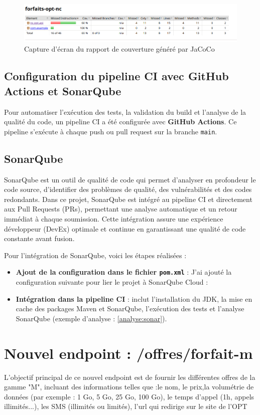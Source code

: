 \documentclass[11pt]{article}
\begin{document}
		\begin{figure}[h!]
			\centering
			\includegraphics[width=\textwidth]{asset/jacoco.png}
			\caption{Capture d'écran du rapport de couverture généré par JaCoCo}
			\label{fig:jacoco-report}
		\end{figure}
		
		\subsection{Configuration du pipeline CI avec GitHub Actions et SonarQube}
		Pour automatiser l'exécution des tests, la validation du build et l'analyse de la qualité du code, un pipeline CI a été configurée avec \textbf{GitHub Actions}. Ce pipeline s'exécute à chaque push ou pull request sur la branche \texttt{main}.
		
		\subsection{SonarQube}
		SonarQube est un outil de qualité de code qui permet d'analyser en profondeur le code source, d'identifier des problèmes de qualité, des vulnérabilités et des codes redondants. Dans ce projet, SonarQube est intégré au pipeline CI et directement aux Pull Requests (PRs), permettant une analyse automatique et un retour immédiat à chaque soumission. Cette intégration assure une expérience développeur (DevEx) optimale et continue en garantissant une qualité de code constante avant fusion.
		
		Pour l'intégration de SonarQube, voici les étapes réalisées :
		\begin{itemize}
			\item \textbf{Ajout de la configuration dans le fichier \texttt{pom.xml}} : J'ai ajouté la configuration suivante pour lier le projet à SonarQube Cloud :

		
			\item\textbf{Intégration dans la pipeline CI} : inclut l'installation du JDK, la mise en cache des packages Maven et SonarQube, l'exécution des tests et l'analyse SonarQube (exemple d'analyse : \ref{analyse:sonar}).
		\end{itemize}
		\section{Nouvel endpoint : /offres/forfait-m}
		L'objectif principal de ce nouvel endpoint est de fournir les différentes offres de la gamme "M", incluant des informations telles que :le nom, le prix,la volumétrie de données (par exemple : 1 Go, 5 Go, 25 Go, 100 Go), le temps d'appel (1h, appels illimités...), les SMS (illimités ou limités), l'url qui redirige sur le site de l'OPT
	
\end{document}
